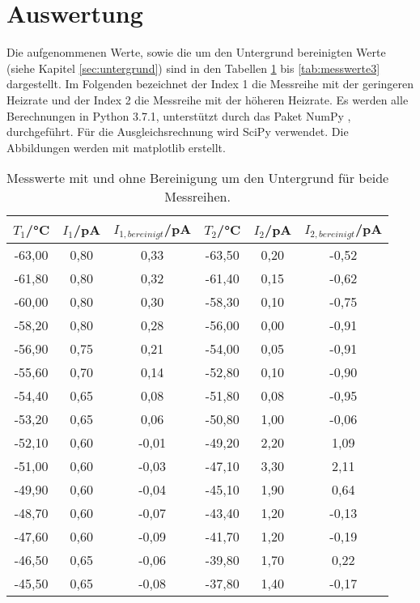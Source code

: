 \section{Auswertung}
\label{sec:Auswertung}

Die aufgenommenen Werte, sowie die um den Untergrund bereinigten Werte (siehe
Kapitel \ref{sec:untergrund}) sind in den Tabellen \ref{tab:messwerte1}
bis \ref{tab:messwerte3} dargestellt. Im Folgenden bezeichnet der Index 1 die
Messreihe mit der geringeren Heizrate und der Index 2 die Messreihe mit der
höheren Heizrate. Es werden alle Berechnungen in Python 3.7.1, unterstützt durch das
Paket NumPy \cite{numpy}, durchgeführt. Für die Ausgleichsrechnung wird SciPy
\cite{scipy} verwendet. Die Abbildungen werden mit matplotlib \cite{matplotlib} erstellt.

\begin{table}[htp]
	\begin{center}
    \caption{Messwerte mit und ohne Bereinigung um den Untergrund für beide Messreihen.}
    \label{tab:messwerte1}
		\begin{tabular}{cccccc}
		\toprule
			{$T_1$/°C} & {$I_1$/pA} & {$I_{1,bereinigt}$/pA} & {$T_2$/°C} & {$I_2$/pA} & {$I_{2,bereinigt}$/pA}\\
			\midrule
			-63,00 & 0,80 & 0,33 & -63,50 & 0,20 & -0,52\\
			-61,80 & 0,80 & 0,32 & -61,40 & 0,15 & -0,62\\
			-60,00 & 0,80 & 0,30 & -58,30 & 0,10 & -0,75\\
			-58,20 & 0,80 & 0,28 & -56,00 & 0,00 & -0,91\\
			-56,90 & 0,75 & 0,21 & -54,00 & 0,05 & -0,91\\
			-55,60 & 0,70 & 0,14 & -52,80 & 0,10 & -0,90\\
			-54,40 & 0,65 & 0,08 & -51,80 & 0,08 & -0,95\\
			-53,20 & 0,65 & 0,06 & -50,80 & 1,00 & -0,06\\
			-52,10 & 0,60 &-0,01 & -49,20 & 2,20 & 1,09\\
			-51,00 & 0,60 &-0,03 & -47,10 & 3,30 & 2,11\\
			-49,90 & 0,60 &-0,04 & -45,10 & 1,90 & 0,64\\
			-48,70 & 0,60 &-0,07 & -43,40 & 1,20 & -0,13\\
			-47,60 & 0,60 &-0,09 & -41,70 & 1,20 & -0,19\\
			-46,50 & 0,65 &-0,06 & -39,80 & 1,70 & 0,22\\
			-45,50 & 0,65 &-0,08 & -37,80 & 1,40 & -0,17\\

\end{tabular}
\end{center}
\end{table}
